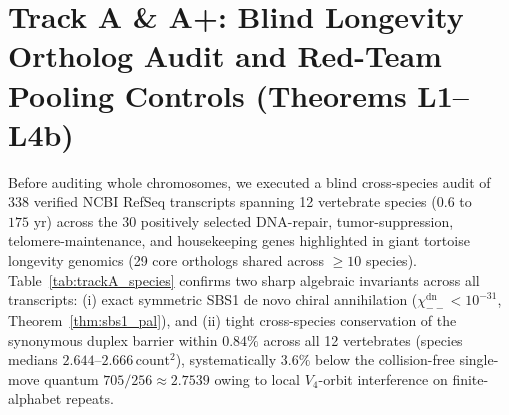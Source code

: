 \documentclass[11pt,a4paper]{article}
\renewcommand{\_}{\origunderscore\penalty200\relax}
\theoremstyle{remark}
\begin{document}
\section{Track A \& A+: Blind Longevity Ortholog Audit and Red-Team Pooling Controls (Theorems L1--L4b)}
Before auditing whole chromosomes, we executed a blind cross-species audit of 338 verified NCBI RefSeq transcripts spanning 12 vertebrate species ($0.6$ to $175\text{ yr}$) across the 30 positively selected DNA-repair, tumor-suppression, telomere-maintenance, and housekeeping genes highlighted in giant tortoise longevity genomics (29 core orthologs shared across $\ge 10$ species). Table~\ref{tab:trackA_species} confirms two sharp algebraic invariants across all transcripts: (i) exact symmetric SBS1 de novo chiral annihilation ($\chi_{--}^{\mathrm{dn}} < 10^{-31}$, Theorem~\ref{thm:sbs1_pal}), and (ii) tight cross-species conservation of the synonymous duplex barrier within $0.84\%$ across all 12 vertebrates (species medians $2.644\text{--}2.666\,\mathrm{count}^2$), systematically $3.6\%$ below the collision-free single-move quantum $705/256 \approx 2.7539$ owing to local $V_4$-orbit interference on finite-alphabet repeats.
\end{document}
